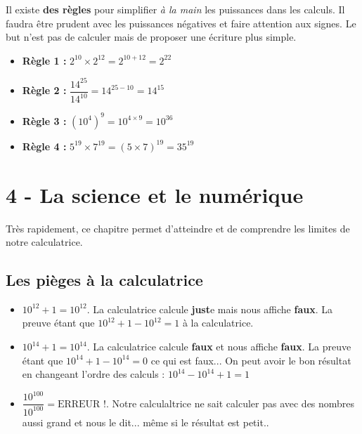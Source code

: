 \documentclass[12pt]{article}
\begin{document}
Il existe \textbf{des règles} pour simplifier \textit{à la main} les puissances dans les calculs. Il faudra être prudent avec les puissances négatives et faire attention aux signes. Le but n'est pas de calculer mais de proposer une écriture plus simple.

\setlength{\columnseprule}{0pt}

\begin{multicols}{2}
  \begin{itemize}
  \item \textbf{Règle 1 : } $ 2^{10} \times 2^{12} = 2^{10 + 12} = 2^{22} $
  \item \textbf{Règle 2 : } $ \dfrac{14^{25}}{14^{10}} = 14^{25 - 10} = 14^{15} $  
  \item \textbf{Règle 3 : } $ (10^4)^9 = 10^{4 \times 9} = 10^36 $
  \item \textbf{Règle 4 : } $ 5^{19} \times 7^{19} = (5 \times 7)^{19} = 35^{19} $
    \end{itemize}
\end{multicols}

\section*{4 - La science et le numérique}

Très rapidement, ce chapitre permet d'atteindre et de comprendre les limites de notre calculatrice. \\

\subsection*{Les pièges à la calculatrice}

  \begin{itemize}
  \item $10^{12} + 1 = 10^{12} $. La calculatrice calcule \textbf{just}e mais nous affiche \textbf{faux}. La preuve étant que $10^12 + 1 - 10^12 = 1$ à la calculatrice.
  \item $10^{14} + 1 = 10^{14} $. La calculatrice calcule \textbf{faux} et nous affiche \textbf{faux}. La preuve étant que $10^14 + 1 - 10^14 = 0$ ce qui est faux... On peut avoir le bon résultat en changeant l'ordre des calculs : $10^14 - 10^14 +1 = 1$ 
  \item $\dfrac{10^{100}}{10^{100}} = \text{ERREUR !} $. Notre calculaltrice ne sait calculer pas avec des nombres aussi grand et nous le dit... même si le résultat est petit..
  \end{itemize}
\end{document}
